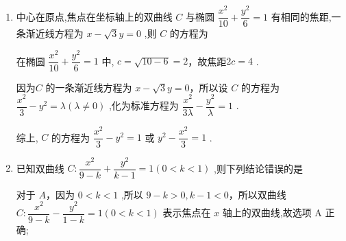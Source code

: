 \begin{enumerate}
\begin{enumerate}
        \begin{enumerate}
            \item 中心在原点,焦点在坐标轴上的双曲线 $C$ 与椭圆 $\dfrac{{x}^{2}}{10} + \dfrac{{y}^{2}}{6} = 1$ 有相同的焦距,一条渐近线方程为 $x - \sqrt{3}y = 0$ ,则 $C$ 的方程为
            
            \begin{jieda}
                在椭圆 $\dfrac{{x}^{2}}{10} + \dfrac{{y}^{2}}{6} = 1$ 中, $c = \sqrt{{10} - 6} = 2$，故焦距${2c} = 4$ .
                
                因为$C$ 的一条渐近线方程为 $x - \sqrt{3}y = 0$，所以设 $C$ 的方程为 $\dfrac{{x}^{2}}{3} - {y}^{2} = \lambda \left( {\lambda  \neq  0}\right)$ ,化为标准方程为 $\dfrac{{x}^{2}}{3\lambda } - \dfrac{{y}^{2}}{\lambda } = 1$ .
                综上, $C$ 的方程为 $\dfrac{{x}^{2}}{3} - {y}^{2} = 1$ 或 ${y}^{2} - \dfrac{{x}^{2}}{3} = 1$ .
            \end{jieda}
            
            \item 已知双曲线 $C : \dfrac{{x}^{2}}{9 - k} + \dfrac{{y}^{2}}{k - 1} = 1\left( {0 < k < 1}\right)$ ,则下列结论错误的是
            
            \begin{jieda}
                对于 ${A}$，因为 $0 < k < 1$ ,所以 $9 - k > 0,k - 1 < 0$，所以双曲线 $C : \dfrac{{x}^{2}}{9 - k} - \dfrac{{y}^{2}}{1 - k} = 1\left( {0 < k < 1}\right)$ 表示焦点在 $x$ 轴上的双曲线,故选项 A 正确;


\end{jieda}
\end{enumerate}
\end{enumerate}
\end{enumerate}
